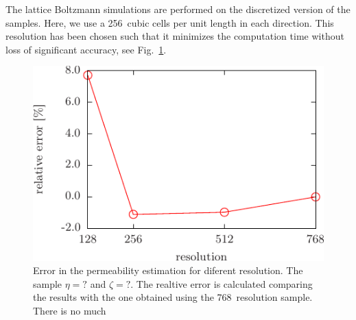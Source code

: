 \documentclass[aps,twocolumn,superscriptaddress,showpacs,showkeys]{revtex4-1}
\begin{document}
The lattice Boltzmann simulations are performed on the discretized version of
the samples. Here, we use a 256~cubic cells per unit length in each
direction. This resolution has been chosen such that it minimizes the
computation time without loss of significant accuracy, see Fig.~\ref{fig:resolution}.
%
\begin{figure}
\includegraphics*[width=1.0\columnwidth]{data-figs/resolution}
\caption{
Error in the permeability estimation for diferent resolution.
The sample $\eta =? $ and $\zeta = ?$.
The realtive error is calculated comparing the results with the one obtained
using the 768~resolution sample. There is no much
\label{fig:resolution}
}
\end{figure}
%
%
\end{document}
